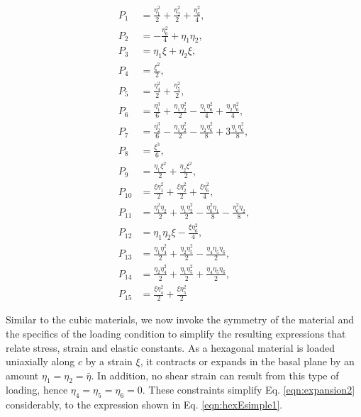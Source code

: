 \documentclass[showpacs,aps,floatfix,prb,reprint,superscriptaddress,onecolumn]{revtex4-1}
\begin{document}
\begin{subequations}
\label{eqn:expansion2detailed} 
\begin{align}
        P_{1} &=\frac{\eta_{1}^2}{2}  + \frac{\eta_{2}^2}{2} + \frac{\eta_{6}^2}{4} ,\\
        P_{2} &=-\frac{\eta_{6}^2}{4} + \eta_{1}\eta_{2} ,\\
				P_{3} &=\eta_{1}\xi + \eta_{2}\xi , \\
				P_{4} &=\frac{\xi^2}{2} , \\
				P_{5} &=\frac{\eta_{4}^2}{2} + \frac{\eta_{5}^2}{2} , \\
				P_{6} &=\frac{\eta_{1}^3}{6} + \frac{\eta_{1}\eta_{2}^2}{2} - \frac{\eta_{1}\eta_{6}^2}{4} + \frac{\eta_{2}\eta_{6}^2}{4} , \\
				P_{7} &=\frac{\eta_{2}^3}{6} - \frac{\eta_{1}\eta_{2}^2}{2} - \frac{\eta_{2}\eta_{6}^2}{8} + 3\frac{\eta_{1}\eta_{6}^2}{8} , \\
				P_{8} &=\frac{\xi^3}{6} , \\
				P_{9} &=\frac{\eta_{1}\xi^2}{2} + \frac{\eta_{2}\xi^2}{2} , \\
				P_{10} &=\frac{\xi \eta_{1}^2}{2} + \frac{\xi \eta_{2}^2}{2} + \frac{\xi \eta_{6}^2}{4} , \\
				P_{11} &=\frac{\eta_{1}^2\eta_{2}}{2} +  \frac{\eta_{1}\eta_{2}^2}{2} - \frac{\eta_{6}^2\eta_{1}}{8} - \frac{\eta_{6}^2\eta_{2}}{8} , \\
				P_{12} &=\eta_{1}\eta_{2}\xi - \frac{\xi\eta_{6}^2}{4} , \\
				P_{13} &=\frac{\eta_{1}\eta_{4}^2}{2} + \frac{\eta_{2}\eta_{5}^2}{2} - \frac{\eta_{4}\eta_{5}\eta_{6}}{2} , \\
				P_{14} &=\frac{\eta_{2}\eta_{4}^2}{2} + \frac{\eta_{1}\eta_{5}^2}{2} + \frac{\eta_{4}\eta_{5}\eta_{6}}{2} , \\
				P_{15} &=\frac{\xi \eta_{4}^2}{2} + \frac{\xi \eta_{5}^2}{2} 
\end{align}
\end{subequations}

Similar to the cubic materials, we now invoke the symmetry of the material and the specifics of the loading condition to simplify the resulting expressions that relate stress, strain and elastic constants. As a hexagonal material is loaded uniaxially along $c$ by a strain $\xi$, it contracts or expands in the basal plane by an amount $\eta_{1} = \eta_{2} = \bar{\eta}$. In addition, no shear strain can result from this type of loading, hence $\eta_{4} = \eta_{5} = \eta_{6} = 0$. These constraints simplify Eq. \ref{eqn:expansion2} considerably, to the expression shown in Eq. \ref{eqn:hexEsimple1}.
\end{document}
